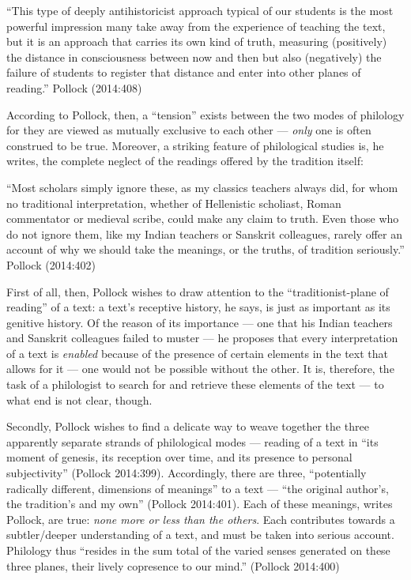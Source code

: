 \begin{myquote}
“This type of deeply antihistoricist approach typical of our students is the most powerful impression many take away from the experience of teaching the text, but it is an approach that carries its own kind of truth, measuring (positively) the distance in consciousness between now and then but also (negatively) the failure of students to register that distance and enter into other planes of reading.”
\hfill Pollock (2014:408)
\end{myquote}

According to Pollock, then, a “tension” exists between the two modes of philology for they are viewed as mutually exclusive to each other --- {\sl only} one is often construed to be true. Moreover, a striking feature of philological studies is, he writes, the complete neglect of the readings offered by the tradition itself: 

\begin{myquote}
“Most scholars simply ignore these, as my classics teachers always did, for whom no traditional interpretation, whether of Hellenistic scholiast, Roman commentator or medieval scribe, could make any claim to truth. Even those who do not ignore them, like my Indian teachers or Sanskrit colleagues, rarely offer an account of why we should take the meanings, or the truths, of tradition seriously.”  			       		     						    
\hfill Pollock (2014:402)
\end{myquote}

First of all, then, Pollock wishes to draw attention to the “traditionist-plane of reading” of a text: a text’s receptive history, he says, is just as important as its genitive history. Of the reason of its importance --- one that his Indian teachers and Sanskrit colleagues failed to muster --- he proposes that every interpretation of a text is {\sl enabled} because of the presence of certain elements in the text that allows for it --- one would not be possible without the other. It is, therefore, the task of a philologist to search for and retrieve these elements of the text --- to what end is not clear, though. 

Secondly, Pollock wishes to find a delicate way to weave together the three apparently separate strands of philological modes --- reading of a text in “its moment of genesis, its reception over time, and its presence to personal subjectivity” (Pollock 2014:399). Accordingly, there are three, “potentially radically different, dimensions of meanings” to a text --- “the original author’s, the tradition’s and my own” (Pollock 2014:401). Each of these meanings, writes Pollock, are true: {\sl none more or less than the others}. Each contributes towards a subtler/deeper understanding of a text, and must be taken into serious account. Philology thus “resides in the sum total of the varied senses generated on these three planes, their lively copresence to our mind.” (Pollock 2014:400)  

